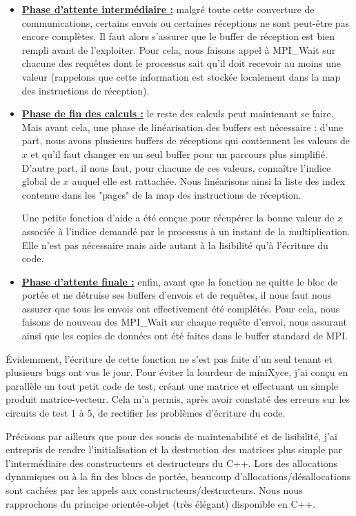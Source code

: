 \documentclass[11pt,a4paper,oneside]{memoir}
\theoremstyle{definition}
\theoremstyle{remark}
\theoremstyle{plain}
\begin{document}
\begin{itemize}
\item \textbf{\underline{Phase d'attente intermédiaire :}} malgré toute cette couverture de communications, certains envois ou certaines réceptions ne sont peut-être pas encore complètes. Il faut alors s'assurer que le buffer de réception est bien rempli avant de l'exploiter. Pour cela, nous faisons appel à MPI\_Wait sur chacune des requêtes dont le processus sait qu'il doit recevoir au moins une valeur (rappelons que cette information est stockée localement dans la map des instructions de réception).\medskip

\item \textbf{\underline{Phase de fin des calculs :}} le reste des calculs peut maintenant se faire. Mais avant cela, une phase de linéarisation des buffers est nécessaire : d'une part, nous avons plusieurs buffers de réceptions qui contiennent les valeurs de $x$ et qu'il faut changer en un seul buffer pour un parcours plus simplifié. D'autre part, il nous faut, pour chacune de ces valeurs, connaître l'indice global de $x$ auquel elle est rattachée. Nous linéarisons ainsi la liste des index contenue dans les "pages" de la map des instructions de réception.

Une petite fonction d'aide a été conçue pour récupérer la bonne valeur de $x$ associée à l'indice demandé par le processus à un instant de la multiplication. Elle n'est pas nécessaire mais aide autant à la lisibilité qu'à l'écriture du code.\medskip

\item \textbf{\underline{Phase d'attente finale :}} enfin, avant que la fonction ne quitte le bloc de portée et ne détruise ses buffers d'envois et de requêtes, il nous faut nous assurer que tous les envois ont effectivement été complétés. Pour cela, nous faisons de nouveau des MPI\_Wait sur chaque requête d'envoi, nous assurant ainsi que les copies de données ont été faites dans le buffer standard de MPI.
\end{itemize}

\'Evidemment, l'écriture de cette fonction ne s'est pas faite d'un seul tenant et plusieurs bugs ont vus le jour. Pour éviter la lourdeur de miniXyce, j'ai conçu en parallèle un tout petit code de test, créant une matrice et effectuant un simple produit matrice-vecteur. Cela m'a permis, après avoir constaté des erreurs sur les circuits de test 1 à 5, de rectifier les problèmes d'écriture du code.

Précisons par ailleurs que pour des soucis de maintenabilité et de lisibilité, j'ai entrepris de rendre l'initialisation et la destruction des matrices plus simple par l'intermédiaire des constructeurs et destructeurs du C++. Lors des allocations dynamiques ou à la fin des blocs de portée, beaucoup d'allocations/désallocations sont cachées par les appels aux constructeurs/destructeurs. Nous nous rapprochons du principe orientée-objet (très élégant) disponible en C++.
\end{document}
